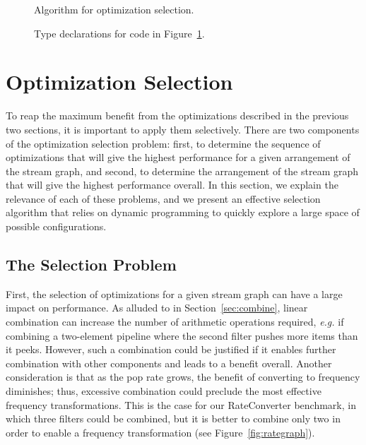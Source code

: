 \begin{figure}[t]
  \caption{Algorithm for optimization selection.
  \protect\label{fig:part-alg}}
\end{figure}

\begin{figure}[t]
  \caption{Type declarations for code in Figure~\ref{fig:part-alg}.
  \protect\label{fig:part-decl}}
\end{figure}


\section{Optimization Selection}
\label{sec:partitioning}

To reap the maximum benefit from the optimizations described in the
previous two sections, it is important to apply them selectively.
There are two components of the optimization selection problem: first,
to determine the sequence of optimizations that will give the highest
performance for a given arrangement of the stream graph, and second,
to determine the arrangement of the stream graph that will give the
highest performance overall.  In this section, we explain the
relevance of each of these problems, and we present an effective
selection algorithm that relies on dynamic programming to quickly
explore a large space of possible configurations.

\subsection{The Selection Problem}

First, the selection of optimizations for a given stream graph can
have a large impact on performance.  As alluded to in
Section~\ref{sec:combine}, linear combination can increase the number
of arithmetic operations required, {\it e.g.} if combining a
two-element pipeline where the second filter pushes more items than it
peeks.  However, such a combination could be justified if it enables
further combination with other components and leads to a benefit
overall.  Another consideration is that as the pop rate grows,
the benefit of converting to frequency diminishes; thus, excessive combination
could preclude the most effective frequency transformations.  
This is the case for our
RateConverter benchmark, in which three filters could be combined, but
it is better to combine only two in order to enable a frequency
transformation (see Figure~\ref{fig:rategraph}).

